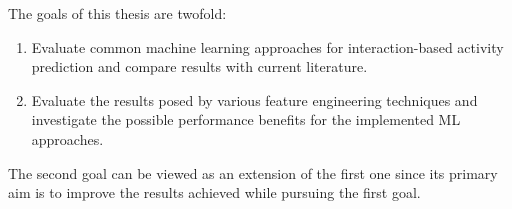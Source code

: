 The goals of this thesis are twofold: 
\begin{enumerate}
    \item Evaluate common machine learning approaches for interaction-based activity prediction 
    and compare results with current literature.
    \item Evaluate the results posed by various feature engineering techniques and 
    investigate the possible performance benefits for the implemented ML approaches. 
\end{enumerate}

The second goal can be viewed as an extension of the first one since its primary aim is to
improve the results achieved while pursuing the first goal.